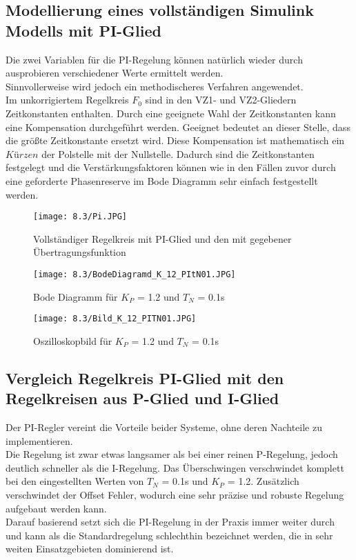 \documentclass[12pt,a4paper]{scrartcl}	%
\begin{document}
\subsection{Modellierung eines vollständigen Simulink Modells mit PI-Glied}
Die zwei Variablen für die PI-Regelung können natürlich wieder durch \glqq ausprobieren \grqq verschiedener Werte ermittelt werden.\\
Sinnvollerweise wird jedoch ein methodischeres Verfahren angewendet.\\
Im unkorrigiertem Regelkreis $F_0$ sind in den VZ1- und VZ2-Gliedern Zeitkonstanten enthalten. Durch eine geeignete Wahl der Zeitkonstanten kann eine Kompensation durchgeführt werden. Geeignet bedeutet an dieser Stelle, dass die größte Zeitkonstante ersetzt wird. Diese Kompensation ist mathematisch ein $Kürzen$ der Polstelle mit der Nullstelle. Dadurch sind die Zeitkonstanten festgelegt und die Verstärkungsfaktoren können wie in den Fällen zuvor durch eine geforderte Phasenreserve im Bode Diagramm sehr einfach festgestellt werden.
\begin{figure}[tbh]
	\centering
	\texttt{[image: 8.3/Pi.JPG]}
	\caption{Vollständiger Regelkreis mit PI-Glied und den mit gegebener Übertragungsfunktion}
\end{figure}
\begin{figure}[tbh]
	\centering
	\texttt{[image: 8.3/BodeDiagramd\_K\_12\_PItN01.JPG]}
	\caption{Bode Diagramm für $K_P$ = 1.2 und $T_N$ = 0.1s}
\end{figure}
\begin{figure}[tbh]
	\centering
	\texttt{[image: 8.3/Bild\_K\_12\_PITN01.JPG]}
	\caption{Oszilloskopbild für $K_P$ = 1.2 und $T_N$ = 0.1s}
\end{figure}
\clearpage
\subsection{Vergleich Regelkreis PI-Glied mit den Regelkreisen aus P-Glied und I-Glied}
Der PI-Regler vereint die Vorteile beider Systeme, ohne deren Nachteile zu implementieren.\\
Die Regelung ist zwar etwas langsamer als bei einer reinen P-Regelung, jedoch deutlich schneller als die I-Regelung.
Das Überschwingen verschwindet komplett bei den eingestellten Werten von $T_N$ = 0.1s und $K_P$ = 1.2. Zusätzlich verschwindet der Offset Fehler, wodurch eine sehr präzise und robuste Regelung aufgebaut werden kann.\\
Darauf basierend setzt sich die PI-Regelung in der Praxis immer weiter durch und kann als die Standardregelung schlechthin bezeichnet werden, die in sehr weiten Einsatzgebieten dominierend ist.
\end{document}

